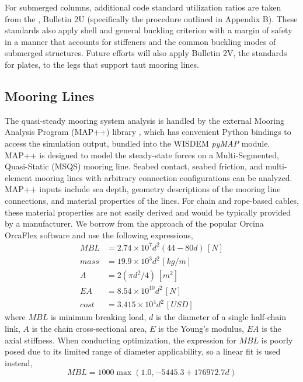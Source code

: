For submerged columns, additional code standard utilization ratios are
taken from the \citet{api2U}, Bulletin 2U (specifically the procedure
outlined in Appendix B).  These standards also apply shell and general
buckling criterion with a margin of safety in a manner that accounts for
stiffeners and the common buckling modes of submerged structures.
Future efforts will also apply Bulletin 2V, the standards for plates, to
the legs that support taut mooring lines.


\subsection{Mooring Lines}
The quasi-steady mooring system analysis is handled by the external
Mooring Analysis Program (MAP++) library \citep{MAP}, which has
convenient Python bindings to access the simulation output, bundled into
the WISDEM \textit{pyMAP} module. MAP++ is designed to model the
steady-state forces on a Multi-Segmented, Quasi-Static (MSQS) mooring
line. Seabed contact, seabed friction, and multi-element mooring lines
with arbitrary connection configurations can be analyzed.  MAP++ inputs
include sea depth, geometry descriptions of the mooring line
connections, and material properties of the lines.  For chain and
rope-based cables, these material properties are not easily derived and
would be typically provided by a manufacturer.  We borrow from the
approach of the popular Orcina OrcaFlex software \citep{orca} and use
the following expressions,
\begin{align*}
MBL &= 2.74\times 10^7  d^2 \left(44 - 80d\right) \,[\unit{N}] \\
mass &= 19.9\times 10^3 d^2 \,[\unit{kg/m}]\\
A &= 2\left(\pi d^2 / 4 \right)\,[\unit{m^2}]\\
EA &= 8.54\times 10^{10} d^2\,[\unit{N}]\\
cost &= 3.415\times 10^4 d^2 \,[\unit{USD}]
\end{align*}
where $MBL$ is minimum breaking load, $d$ is the diameter of a single
half-chain link, $A$ is the chain cross-sectional area, $E$ is the
Young's modulus, $EA$ is the axial stiffness.  When conducting
optimization, the expression for $MBL$ is poorly posed due to its limited
range of diameter applicability, so a linear fit is used instead,
\begin{equation}
MBL = 1000 \max\left(1.0, -5445.3 + 176972.7 d\right)
\end{equation}  


